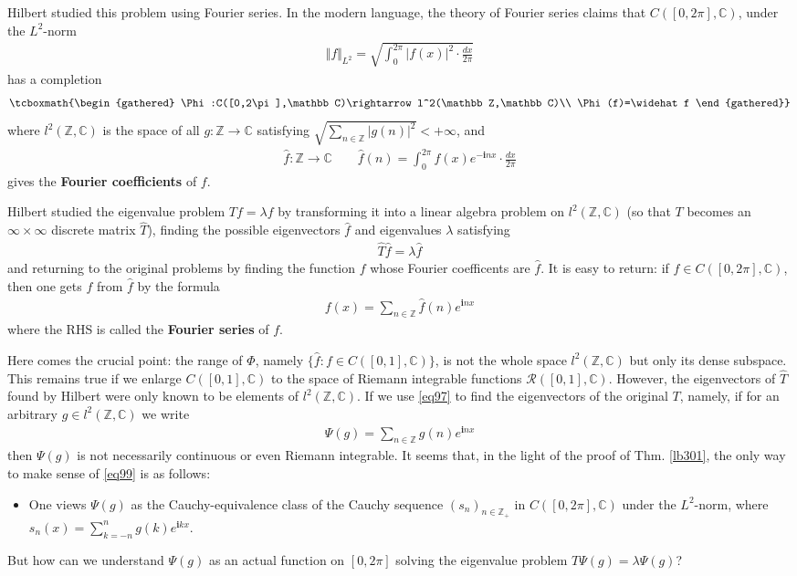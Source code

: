 \documentclass[12pt,b5paper,notitlepage]{article}
\theoremstyle{definition}
\theoremstyle{plain}
\newcommand{\wht}{\widehat}
\newcommand{\scr}{\mathscr}
\newcommand{\im}{\mathbf{i}}
\newcommand{\Cbb}{\mathbb C}
\newcommand{\Zbb}{\mathbb Z}
\numberwithin{equation}{section}
\begin{document}
Hilbert studied this problem using Fourier series. In the modern language, the theory of Fourier series claims that $C([0,2\pi],\Cbb)$, under the $L^2$-norm
\begin{align}\label{eq100}
\Vert f\Vert_{L^2}=\sqrt{\int_0^{2\pi}|f(x)|^2\cdot \frac{dx}{2\pi} }
\end{align}
has a completion
\begin{gather}\label{eq98}
\tcboxmath{\begin{gathered}
\Phi:C([0,2\pi],\Cbb)\rightarrow l^2(\Zbb,\Cbb)\\
\Phi(f)=\wht f
\end{gathered}}
\end{gather}
where $l^2(\Zbb,\Cbb)$ is the space of all $g:\Zbb\rightarrow\Cbb$ satisfying $\sqrt{\sum_{n\in\Zbb} |g(n)|^2}<+\infty$, and 
\begin{gather*}
\wht f:\Zbb\rightarrow\Cbb\qquad 
\wht f(n)=\int_0^{2\pi} f(x)e^{-\im nx}\cdot \frac{dx}{2\pi}
\end{gather*}
gives the \textbf{Fourier coefficients} of $f$.

Hilbert studied the eigenvalue problem $Tf=\lambda f$ by transforming it into a linear algebra problem on $l^2(\Zbb,\Cbb)$ (so that $T$ becomes an $\infty\times\infty$ discrete matrix $\wht T$), finding the possible eigenvectors $\wht f$ and eigenvalues $\lambda$ satisfying
\begin{align*}
\wht T\wht f=\lambda\wht f
\end{align*}
and returning to the original problems by finding the function $f$ whose Fourier coefficents are $\wht f$. It is easy to return: if $f\in C([0,2\pi],\Cbb)$, then one gets $f$ from $\wht f$ by the formula
\begin{align}
f(x)=\sum_{n\in\Zbb} \wht f(n)e^{\im nx} \label{eq97}
\end{align} 
where the RHS is called the \textbf{Fourier series} of $f$.

Here comes the crucial point: the range of $\Phi$, namely $\{\wht f:f\in C([0,1],\Cbb)\}$, is not the whole space $l^2(\Zbb,\Cbb)$ but only its dense subspace. This remains true if we enlarge $C([0,1],\Cbb)$ to the space of Riemann integrable functions $\scr R([0,1],\Cbb)$. However, the eigenvectors of $\wht T$ found by Hilbert were only known to be elements of $l^2(\Zbb,\Cbb)$. If we use \eqref{eq97} to find the eigenvectors of the original $T$, namely, if for an arbitrary $g\in l^2(\Zbb,\Cbb)$ we write 
\begin{align}
\Psi(g)=\sum_{n\in\Zbb} g(n)e^{\im nx}  \label{eq99}
\end{align}
then $\Psi(g)$ is not necessarily continuous or even Riemann integrable. It seems that, in the light of the proof of Thm. \ref{lb301}, the only way to make sense of \eqref{eq99} is as follows:
\begin{itemize}
\item One views $\Psi(g)$ as the Cauchy-equivalence class of the Cauchy sequence $(s_n)_{n\in\Zbb_+}$ in $C([0,2\pi],\Cbb)$ under the $L^2$-norm, where $s_n(x)=\sum_{k=-n}^n g(k)e^{\im kx}$.
\end{itemize}
But how can we understand $\Psi(g)$ as an actual function on $[0,2\pi]$ solving the eigenvalue problem $T\Psi(g)=\lambda\Psi(g)$? 
\end{document}
